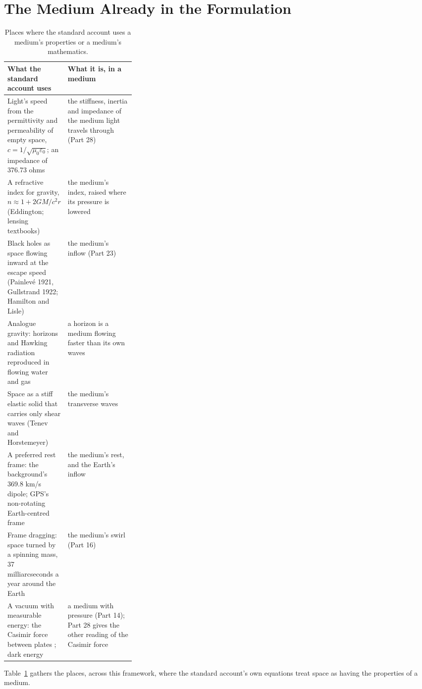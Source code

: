 \section{The Medium Already in the Formulation}

\begin{table}[t]\centering\small
\caption{Places where the standard account uses a medium's properties or a medium's mathematics.}
\begin{tabularx}{\linewidth}{@{}>{\raggedright}p{0.3\linewidth} X@{}}\toprule
\textbf{What the standard account uses} & \textbf{What it is, in a medium}\\\midrule
Light's speed from the permittivity and permeability of empty space, $c = 1/\sqrt{\mu_0\varepsilon_0}$; an impedance of 376.73 ohms & the stiffness, inertia and impedance of the medium light travels through (Part 28)\\
A refractive index for gravity, $n \approx 1 + 2GM/c^2r$ (Eddington; lensing textbooks) & the medium's index, raised where its pressure is lowered\\
Black holes as space flowing inward at the escape speed (Painlev\'e 1921, Gullstrand 1922; Hamilton and Lisle) & the medium's inflow (Part 23)\\
Analogue gravity: horizons and Hawking radiation reproduced in flowing water and gas \citep{barcelo2011} & a horizon is a medium flowing faster than its own waves\\
Space as a stiff elastic solid that carries only shear waves (Tenev and Horstemeyer) & the medium's transverse waves\\
A preferred rest frame: the background's 369.8 km/s dipole; GPS's non-rotating Earth-centred frame & the medium's rest, and the Earth's inflow\\
Frame dragging: space turned by a spinning mass, 37 milliarcseconds a year around the Earth \citep{everitt2011} & the medium's swirl (Part 16)\\
A vacuum with measurable energy: the Casimir force between plates \citep{lamoreaux1997}; dark energy & a medium with pressure (Part 14); Part 28 gives the other reading of the Casimir force\\\bottomrule
\end{tabularx}\label{tab:inform}\end{table}

Table~\ref{tab:inform} gathers the places, across this framework, where the standard account's own equations treat space as having the properties of a medium.

